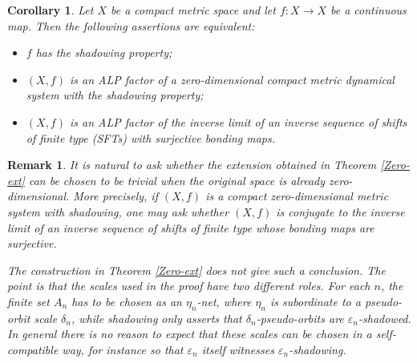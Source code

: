 \documentclass[10pt,a4paper]{amsart}
\newtheorem{corollary}[theorem]{Corollary}
\numberwithin{equation}{section}
\newtheorem{remark}[theorem]{Remark}
\begin{document}
\begin{corollary}\label{metc}
Let $X$ be a compact metric space and let $f: X\to X$ be a continuous map. Then the following assertions are equivalent:
\begin{itemize}
    \item $f$ has the shadowing property;
    \item $(X, f)$ is an ALP factor of a zero-dimensional compact metric dynamical system with the shadowing property;
    \item $(X, f)$ is an ALP factor of the inverse limit of an inverse sequence of shifts of finite type (SFTs) with surjective bonding maps.
\end{itemize}
\end{corollary}



\begin{remark}
It is natural to ask whether the extension obtained in Theorem \ref{Zero-ext}
can be chosen to be trivial when the original space is already
zero-dimensional. More precisely, if $(X,f)$ is a compact zero-dimensional
metric system with shadowing, one may ask whether $(X,f)$ is conjugate to the
inverse limit of an inverse sequence of shifts of finite type whose bonding
maps are surjective.

The construction in Theorem \ref{Zero-ext} does not give such a conclusion.
The point is that the scales used in the proof have two different roles. For
each $n$, the finite set $A_n$ has to be chosen as an $\eta_n$-net, where
$\eta_n$ is subordinate to a pseudo-orbit scale $\delta_n$, while shadowing only
asserts that $\delta_n$-pseudo-orbits are $\varepsilon_n$-shadowed. In general
there is no reason to expect that these scales can be chosen in a
self-compatible way, for instance so that $\varepsilon_n$ itself witnesses
$\varepsilon_n$-shadowing.
\end{remark}
\end{document}
